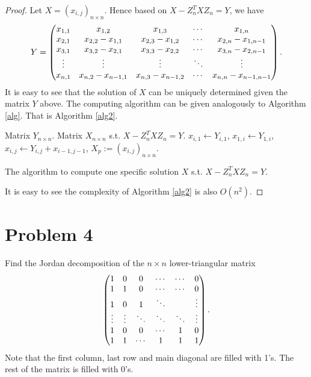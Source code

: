 \documentclass[12pt]{article}
\theoremstyle{plain}
\begin{document}
\begin{proof}
Let $X = (x_{i,j})_{n\times n}$. Hence based on $X- Z_n^T XZ_n = Y$, we have
$$Y=\begin{pmatrix}
x_{1,1} & x_{1,2} & x_{1,3} & \cdots & x_{1,n} \\
x_{2,1} & x_{2,2}-x_{1,1} & x_{2,3}-x_{1,2} & \cdots & x_{2,n}-x_{1,n-1} \\
x_{3,1} & x_{3,2}-x_{2,1} & x_{3,3}-x_{2,2} & \cdots & x_{3,n}-x_{2,n-1} \\
\vdots & \vdots & \vdots & \ddots & \vdots \\
x_{n,1} & x_{n,2}-x_{n-1,1} & x_{n,3}-x_{n-1,2} & \cdots & x_{n,n}-x_{n-1,n-1} \\
\end{pmatrix}.$$
It is easy to see that the solution of $X$ can be uniquely determined given the matrix $Y$ above. The computing algorithm can be given analogously to Algorithm \ref{alg}. That is Algorithm \ref{alg2}.

\begin{algorithm}
\centering
\begin{minipage}{0.95\textwidth}
\begin{algorithmic}
\Require Matrix $Y_{n\times n}$.
\Ensure Matrix $X_{n\times n}$ s.t. $X- Z_n^T XZ_n = Y$.
	\State $x_{i,1} \gets Y_{i,1}$,
\EndFor
{}
	\State $x_{1,i} \gets Y_{1,i}$,
\EndFor
{}
		\State $x_{i,j} \gets Y_{i,j} + x_{i-1,j-1}$,
	\EndFor
\EndFor
{} $X_p := (x_{i,j})_{n\times n}$.
\end{algorithmic}
\end{minipage}
\caption{The algorithm to compute one specific solution $X$ s.t. $X- Z_n^T XZ_n = Y$.}
\label{alg2}
\end{algorithm}

It is easy to see the complexity of Algorithm \ref{alg2} is also $O(n^2)$.

\end{proof}

\section{Problem 4}
Find the Jordan decomposition of the $n\times n$ lower-triangular matrix
$$
\begin{pmatrix}
1 & 0 & 0 & \cdots & \cdots & 0 \\
1 & 1 & 0 & \cdots & \cdots & 0 \\
1 & 0 & 1 & \ddots &  & \vdots \\
\vdots & \vdots & \ddots & \ddots & \ddots & \vdots \\
1 & 0 & 0 & \cdots & 1 & 0 \\
1 & 1 & \cdots & 1 & 1 & 1 \\
\end{pmatrix}.
$$
Note that the first column, last row and main diagonal are filled with 1's. The rest of the matrix is filled with 0's.
\end{document}
